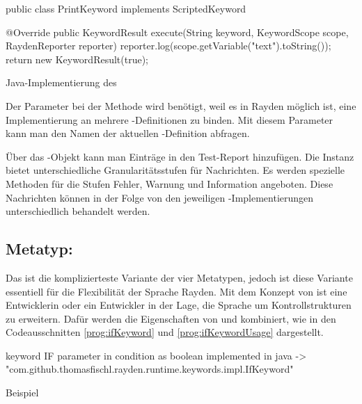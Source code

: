 \begin{program}
\begin{JavaCode}
public class PrintKeyword implements ScriptedKeyword {

	@Override
	public KeywordResult execute(String keyword, 
			KeywordScope scope, RaydenReporter reporter) {
		reporter.log(scope.getVariable("text").toString());
		return new KeywordResult(true);
	}
	
}
\end{JavaCode}
\caption{Java-Implementierung des }
\label{prog:scriptedKeywordImpl}
\end{program}

\SuperPar
Der Parameter  bei der Methode  wird benötigt, weil es in Rayden möglich ist, eine Implementierung an mehrere -Definitionen zu binden. Mit diesem Parameter kann man den Namen der aktuellen -Definition abfragen.

\SuperPar
Über das -Objekt kann man Einträge in den Test-Report hinzufügen. Die Instanz bietet unterschiedliche Granularitätsstufen für Nachrichten. Es werden spezielle Methoden für die Stufen Fehler, Warnung und Information angeboten. Diese Nachrichten können in der Folge von den jeweiligen -Implementierungen unterschiedlich behandelt werden. 


\subsection{Metatyp: }

Das  ist die komplizierteste Variante der vier Metatypen, jedoch ist diese Variante essentiell für die Flexibilität der Sprache Rayden. Mit dem Konzept von  ist eine Entwicklerin oder ein Entwickler in der Lage, die Sprache um Kontrollstrukturen zu erweitern. Dafür werden die Eigenschaften von  und  kombiniert, wie in den Codeausschnitten \ref{prog:ifKeyword} und \ref{prog:ifKeywordUsage} dargestellt. 

\begin{program}
\begin{JavaCode}
keyword IF { 
	parameter in condition as boolean
	implemented in java -> "com.github.thomasfischl.rayden.runtime.keywords.impl.IfKeyword"
}
\end{JavaCode}
\caption{Beispiel }
\label{prog:ifKeyword}
\end{program}

